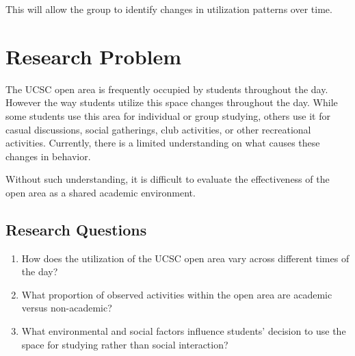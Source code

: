 \documentclass[12pt]{report}
\begin{document}
This will allow the group to identify changes in utilization patterns over time.

\chapter{Research Problem}

The UCSC open area is frequently occupied by students throughout the day. However the way students utilize this space changes throughout the day. While some students use this area for individual or group studying, others use it for casual discussions, social gatherings, club activities, or other recreational activities. Currently, there is a limited understanding on what causes these changes in behavior.


Without such understanding, it is difficult to evaluate the effectiveness of the open area as a shared academic environment.

\section*{Research Questions}

\begin{enumerate}
    \item How does the utilization of the UCSC open area vary across different times of the day?
    
    \item What proportion of observed activities within the open area are academic versus non-academic?
    
    \item What environmental and social factors influence students' decision to use the space for studying rather than social interaction?
\end{enumerate}
\end{document}
